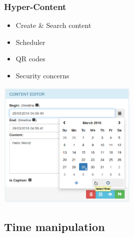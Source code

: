 \documentclass[compress]{beamer}
\begin{document}
		\begin{frame}[c]
		\frametitle{Hyper-Content}


		\begin{itemize}
			\item Create \& Search content \vfill
			\item Scheduler \vfill
			\item QR codes \vfill
			\item Security concerns
		\end{itemize}

		\begin{flushright}

			\vspace*{-11\baselineskip}
			\includegraphics[width=0.5\textwidth]{figures/edition.png}
		\end{flushright}
		

		\end{frame}


\subsection{Time manipulation}
\end{document}
